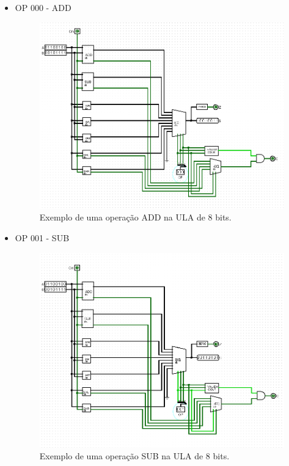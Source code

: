 \documentclass[
	12pt,				%
	openright,			%
	twoside,			%
	a4paper,			%
	english,			%
	french,				%
	spanish,			%
	brazil,				%
	]{abntex2}
\begin{document}
\begin{apendicesenv}
\begin{itemize}
\item {OP 000 - ADD}

\begin{figure}[H]
	\begin{center}
	    \includegraphics[scale=0.5]{imagens/alu8000add.png}
	\end{center}
\caption{\label{alu8000add}Exemplo de uma operação ADD na ULA de 8 bits.}
\end{figure}

\newpage
\item{OP 001 - SUB}

\begin{figure}[H]
	\begin{center}
	    \includegraphics[scale=0.5]{imagens/alu8001sub.png}
	\end{center}
\caption{\label{alu001sub}Exemplo de uma operação SUB na ULA de 8 bits.}
\end{figure}


\end{itemize}
\end{apendicesenv}
\end{document}
